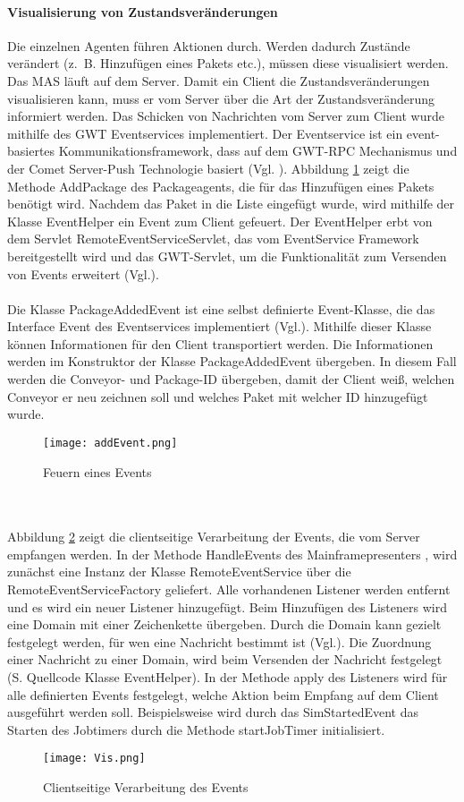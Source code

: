\paragraph{Visualisierung von Zustandsveränderungen}
Die einzelnen Agenten führen Aktionen durch. Werden dadurch Zustände verändert (z.~B. Hinzufügen eines Pakets etc.), müssen diese visualisiert werden. Das MAS läuft auf dem Server. Damit ein Client die Zustandsveränderungen visualisieren kann, muss er vom Server über die Art der Zustandsveränderung informiert werden. Das Schicken von Nachrichten vom Server zum Client wurde mithilfe des GWT Eventservices implementiert. Der Eventservice ist ein event-basiertes Kommunikationsframework, dass auf dem GWT-RPC Mechanismus und der Comet Server-Push Technologie basiert (Vgl. \cite{gwteventservice}). Abbildung \ref{addEvent} zeigt die Methode AddPackage des Packageagents, die für das Hinzufügen eines Pakets benötigt wird. Nachdem das Paket in die Liste eingefügt wurde, wird mithilfe der Klasse EventHelper ein Event zum Client gefeuert. Der EventHelper erbt von dem Servlet RemoteEventServiceServlet, das vom EventService Framework bereitgestellt wird und das GWT-Servlet, um die Funktionalität zum Versenden von Events erweitert (Vgl.\cite{gwteventservice}). 
\\\\
Die Klasse PackageAddedEvent ist eine selbst definierte Event-Klasse, die das Interface Event des Eventservices implementiert (Vgl.\cite{gwteventservice}). Mithilfe dieser Klasse können Informationen für den Client transportiert werden. Die Informationen werden im Konstruktor der Klasse PackageAddedEvent übergeben. In diesem Fall werden die Conveyor- und Package-ID übergeben, damit der Client weiß, welchen Conveyor er neu zeichnen soll und welches Paket mit welcher ID hinzugefügt wurde.
\begin{figure}[h!]
	\centering
		\texttt{[image: addEvent.png]}        
		\caption{Feuern eines Events}
	\label{addEvent}
\end{figure}
\\\\
Abbildung \ref{addEventClient} zeigt die clientseitige Verarbeitung der Events, die vom Server empfangen werden. In der Methode HandleEvents des Mainframepresenters , wird zunächst eine Instanz der Klasse RemoteEventService über die RemoteEventServiceFactory geliefert. Alle vorhandenen Listener werden entfernt und es wird ein neuer Listener hinzugefügt. Beim Hinzufügen des Listeners wird eine Domain mit einer Zeichenkette übergeben. Durch die Domain kann gezielt festgelegt werden, für wen eine Nachricht bestimmt ist (Vgl.\cite{gwteventservice}). Die Zuordnung einer Nachricht zu einer Domain, wird beim Versenden der Nachricht festgelegt (S. Quellcode Klasse EventHelper). In der Methode apply des Listeners wird für alle definierten Events festgelegt, welche Aktion beim Empfang auf dem Client ausgeführt werden soll. Beispielsweise wird durch das SimStartedEvent das Starten des Jobtimers durch die Methode startJobTimer initialisiert.  
\begin{figure}[h!]
	\centering
		\texttt{[image: Vis.png]}        
		\caption{Clientseitige Verarbeitung des Events}
	\label{addEventClient}
\end{figure} 